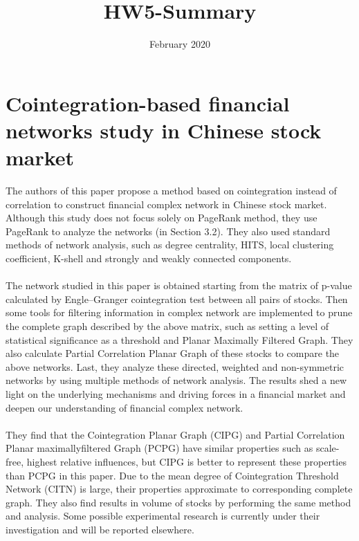 \documentclass{article}
\title{HW5-Summary}
\date{February 2020}
\begin{document}
\maketitle

\section{Cointegration-based financial networks study in Chinese stock market}
The authors of this paper propose a method based on cointegration instead of correlation to construct financial complex network in Chinese stock market. Although this study does not focus solely on PageRank method, they use PageRank to analyze the networks (in Section 3.2). They also used standard methods of network analysis, such as degree centrality, HITS, local clustering coefficient, K-shell and strongly and weakly connected components.\\\\
The network studied in this paper is obtained starting from the matrix of p-value calculated by Engle–Granger cointegration test between all pairs of stocks. Then some tools for filtering information in complex network are implemented to prune the complete graph described by the above matrix, such as setting a level of statistical significance as a threshold and Planar Maximally Filtered Graph. They also calculate Partial Correlation Planar Graph of these stocks to compare the above networks. Last, they analyze these directed, weighted and non-symmetric networks by using multiple methods of network analysis. The results shed a new light on the underlying mechanisms and driving forces in a financial market and deepen our understanding of financial complex network.\\\\
They find that the Cointegration Planar Graph (CIPG) and Partial Correlation Planar maximallyfiltered Graph (PCPG) have similar properties such as scale-free, highest relative influences, but CIPG is better to represent these properties than PCPG in this paper. Due to the mean degree of Cointegration Threshold Network (CITN) is large, their properties approximate to corresponding complete graph. They also find results in volume of stocks by performing the same method and analysis. Some possible experimental research is currently under their investigation and will be reported elsewhere.\\\\
\end{document}
